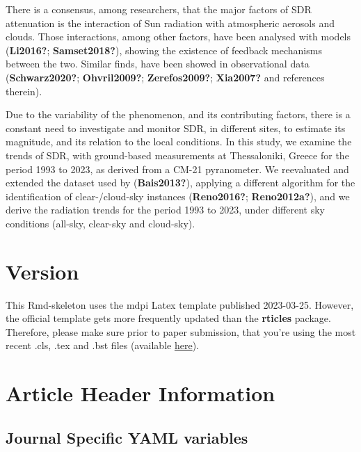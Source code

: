 \documentclass[
]{article}
\begin{document}
There is a consensus, among researchers, that the major factors of SDR attenuation is the interaction of Sun radiation with atmospheric aerosols and clouds.
Those interactions, among other factors, have been analysed with models (\textbf{Li2016?}; \textbf{Samset2018?}), showing the existence of feedback mechanisms between the two.
Similar finds, have been showed in observational data (\textbf{Schwarz2020?}; \textbf{Ohvril2009?}; \textbf{Zerefos2009?}; \textbf{Xia2007?} and references therein).

Due to the variability of the phenomenon, and its contributing factors, there is a constant need to investigate and monitor SDR, in different sites, to estimate its magnitude, and its relation to the local conditions.
In this study, we examine the trends of SDR, with ground-based measurements at Thessaloniki, Greece for the period 1993 to 2023, as derived from a CM-21 pyranometer.
We reevaluated and extended the dataset used by (\textbf{Bais2013?}), applying a different algorithm for the identification of clear-/cloud-sky instances (\textbf{Reno2016?}; \textbf{Reno2012a?}), and we derive the radiation trends for the period 1993 to 2023, under different sky conditions (all-sky, clear-sky and cloud-sky).

\hypertarget{version}{%
\section{Version}\label{version}}

This Rmd-skeleton uses the mdpi Latex template published 2023-03-25.
However, the official template gets more frequently updated than the \textbf{rticles}
package. Therefore, please make sure prior to paper submission, that you're
using the most recent .cls, .tex and .bst files
(available \href{http://www.mdpi.com/authors/latex}{here}).

\hypertarget{article-header-information}{%
\section{Article Header Information}\label{article-header-information}}

\hypertarget{journal-specific-yaml-variables}{%
\subsection{Journal Specific YAML variables}\label{journal-specific-yaml-variables}}

\startlandscape
\end{document}
